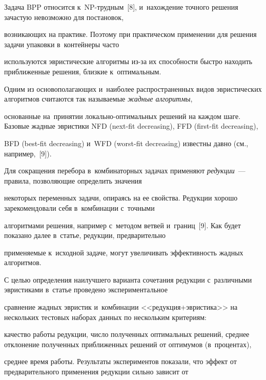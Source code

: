 Задача BPP относится к~NP-трудным~[8], и~на\-хож\-де\-ние точ\-но\-го решения за\-час\-тую не\-воз\-мож\-но для по\-ста\-но\-вок, 

воз\-ни\-ка\-ющих на практике. Поэтому при практическом применении для решения задачи упа\-ков\-ки в~контейнеры час\-то 

используются эвристические алгоритмы  из-за их способности быст\-ро находить при\-бли\-жен\-ные решения, близ\-кие к~оптимальным. 

Одним из осно\-во\-по\-ла\-га\-ющих и~наиболее распространенных видов эвристических алгоритмов считаются так на\-зы\-ва\-емые \textit{жад\-ные алгоритмы}, 

основанные на~принятии ло\-каль\-но-оп\-ти\-маль\-ных решений на каж\-дом шаге. Базовые жад\-ные эвристики NFD (next-fit decreasing), FFD (first-fit decreasing), 

BFD (best-fit decreasing) и~WFD (worst-fit decreasing) известны дав\-но (см., например,~[9]).



Для сокращения перебора в~комбинаторных задачах применяют \textit{редукции}~--- правила, поз\-во\-ля\-ющие определить значения 

некоторых переменных задачи, опираясь на ее свойства. Редукции хорошо зарекомендовали себя в~комбинации с~точными 

алгоритмами решения, например с~методом вет\-вей и~границ~[9]. Как будет показано далее в~\mbox{статье}, редукции, предварительно 

при\-ме\-ня\-емые к~исходной задаче, могут увеличивать эф\-фек\-тив\-ность жад\-ных ал\-го\-рит\-мов.

{ %



}



С целью определения наилучшего варианта сочетания редукции с~различными эвристиками в~\mbox{статье} проведено экспериментальное 

срав\-не\-ние жад\-ных эвристик и~комбинации <<ре\-дук\-ция\;+\;эв\-ри\-сти\-ка>> на нескольких тес\-то\-вых наборах данных по нескольким критериям: 

качество работы редукции, чис\-ло полученных оптимальных решений, сред\-нее отклонение полученных при\-бли\-жен\-ных решений от оптимумов (в~процентах), 

сред\-нее время работы. Результаты экспериментов показали, что эффект от предварительного применения редукции сильно зависит от 

